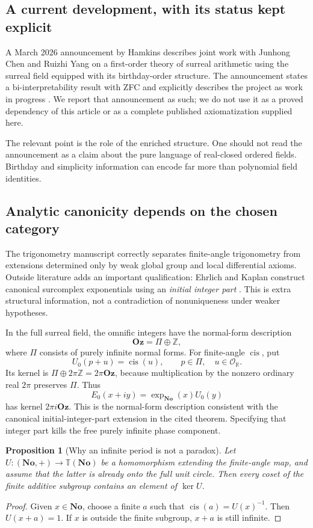 \documentclass[11pt,letterpaper]{article}
\numberwithin{equation}{section}
\newtheorem{proposition}[theorem]{Proposition}
\theoremstyle{definition}
\theoremstyle{remark}
\newcommand{\No}{\mathbf{No}}
\newcommand{\Oz}{\mathbf{Oz}}
\newcommand{\R}{\mathbb{R}}
\newcommand{\Z}{\mathbb{Z}}
\newcommand{\OO}{\mathcal{O}}
\newcommand{\cis}{\operatorname{cis}}
\begin{document}
\subsection{A current development, with its status kept explicit}
A March 2026 announcement by Hamkins describes joint work with Junhong Chen and Ruizhi Yang on a first-order theory of surreal arithmetic using the surreal field equipped with its birthday-order structure. The announcement states a bi-interpretability result with ZFC and explicitly describes the project as work in progress \cite{SurrealArithmetic}. We report that announcement as such; we do not use it as a proved dependency of this article or as a complete published axiomatization supplied here.

The relevant point is the role of the enriched structure. One should not read the announcement as a claim about the pure language of real-closed ordered fields. Birthday and simplicity information can encode far more than polynomial field identities.

\subsection{Analytic canonicity depends on the chosen category}\label{subsec:canonicalexp}
The trigonometry manuscript correctly separates finite-angle trigonometry from extensions determined only by weak global group and local differential axioms. Outside literature adds an important qualification: Ehrlich and Kaplan construct canonical surcomplex exponentials using an \emph{initial integer part} \cite[\S11]{EKExp}. This is extra structural information, not a contradiction of nonuniqueness under weaker hypotheses.

In the full surreal field, the omnific integers have the normal-form description
\[
 \Oz=\Pi\oplus\Z,
\]
where $\Pi$ consists of purely infinite normal forms. For finite-angle $\cis$, put
\[
 U_0(p+u)=\cis(u),\qquad p\in\Pi,\quad u\in\OO_{\R}.
\]
Its kernel is $\Pi\oplus2\pi\Z=2\pi\Oz$, because multiplication by the nonzero ordinary real $2\pi$ preserves $\Pi$. Thus
\[
 E_0(x+iy)=\exp_{\No}(x)U_0(y)
\]
has kernel $2\pi i\Oz$. This is the normal-form description consistent with the canonical initial-integer-part extension in the cited theorem. Specifying that integer part kills the free purely infinite phase component.

\begin{proposition}[Why an infinite period is not a paradox]\label{prop:period}
Let $U:(\No,+)\to\mathbb T(\No)$ be a homomorphism extending the finite-angle map, and assume that the latter is already onto the full unit circle. Then every coset of the finite additive subgroup contains an element of $\ker U$.
\end{proposition}
\begin{proof}
Given $x\in\No$, choose a finite $a$ such that $\cis(a)=U(x)^{-1}$. Then $U(x+a)=1$. If $x$ is outside the finite subgroup, $x+a$ is still infinite.
\end{proof}
\end{document}
